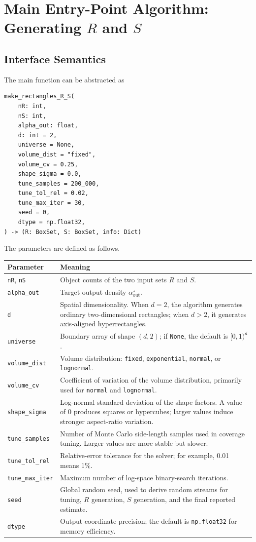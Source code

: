 \documentclass[11pt,a4paper]{article}
\newcommand{\code}[1]{\texttt{#1}}
\begin{document}
\section{Main Entry-Point Algorithm: Generating $R$ and $S$}

\subsection{Interface Semantics}

The main function can be abstracted as
\begin{verbatim}
make_rectangles_R_S(
    nR: int,
    nS: int,
    alpha_out: float,
    d: int = 2,
    universe = None,
    volume_dist = "fixed",
    volume_cv = 0.25,
    shape_sigma = 0.0,
    tune_samples = 200_000,
    tune_tol_rel = 0.02,
    tune_max_iter = 30,
    seed = 0,
    dtype = np.float32,
) -> (R: BoxSet, S: BoxSet, info: Dict)
\end{verbatim}

The parameters are defined as follows.

\begin{longtable}{>{\raggedright\arraybackslash}p{3.5cm}p{10cm}}
\toprule
\textbf{Parameter} & \textbf{Meaning} \\
\midrule
\endhead
\code{nR}, \code{nS} & Object counts of the two input sets $R$ and $S$. \\
\code{alpha\_out} & Target output density $\alpha_{\mathrm{out}}^\star$. \\
\code{d} & Spatial dimensionality. When $d=2$, the algorithm generates ordinary two-dimensional rectangles; when $d>2$, it generates axis-aligned hyperrectangles. \\
\code{universe} & Boundary array of shape $(d,2)$; if \code{None}, the default is $[0,1)^d$. \\
\code{volume\_dist} & Volume distribution: \code{fixed}, \code{exponential}, \code{normal}, or \code{lognormal}. \\
\code{volume\_cv} & Coefficient of variation of the volume distribution, primarily used for \code{normal} and \code{lognormal}. \\
\code{shape\_sigma} & Log-normal standard deviation of the shape factors. A value of 0 produces squares or hypercubes; larger values induce stronger aspect-ratio variation. \\
\code{tune\_samples} & Number of Monte Carlo side-length samples used in coverage tuning. Larger values are more stable but slower. \\
\code{tune\_tol\_rel} & Relative-error tolerance for the solver; for example, 0.01 means 1\%. \\
\code{tune\_max\_iter} & Maximum number of log-space binary-search iterations. \\
\code{seed} & Global random seed, used to derive random streams for tuning, $R$ generation, $S$ generation, and the final reported estimate. \\
\code{dtype} & Output coordinate precision; the default is \code{np.float32} for memory efficiency. \\
\bottomrule
\end{longtable}
\end{document}
